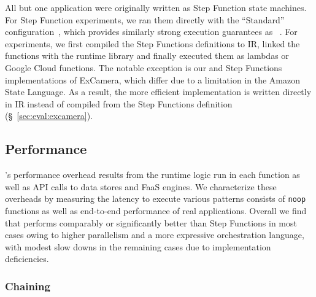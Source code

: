 All but one application were originally written as Step Function state
machines. For Step Function experiments, we ran them directly with the
``Standard'' configuration~\cite{aws-step-functions-standard-vs-express},
which provides similarly strong execution guarantees as
\name{}~\cite{aws-step-functions-exec-gntee}. For \name{} experiments, we
first compiled the Step Functions definitions to \name{} IR, linked the
functions with the \name{} runtime library and finally executed them as
lambdas or Google Cloud functions. The notable exception is our \name{} and
Step Functions implementations of ExCamera, which differ due to a limitation
in the Amazon State Language. As a result, the more efficient \name {}
implementation is written directly in \name{} IR instead of compiled from the
Step Functions definition (\S~\ref{sec:eval:excamera}).

\subsection{Performance}\label{sec:eval:micro}

\name{}'s performance overhead results from the \name{} runtime logic run in
each function as well as API calls to data stores and FaaS engines. We
characterize these overheads by measuring the latency to execute various
patterns consists of \texttt{noop} functions as well as end-to-end performance
of real applications. Overall we find that \name{} performs comparably or
significantly better than Step Functions in most cases owing to higher
parallelism and a more expressive orchestration language, with modest slow
downs in the remaining cases due to implementation deficiencies.

\subsubsection{Chaining}\label{sec:eval:chain}

